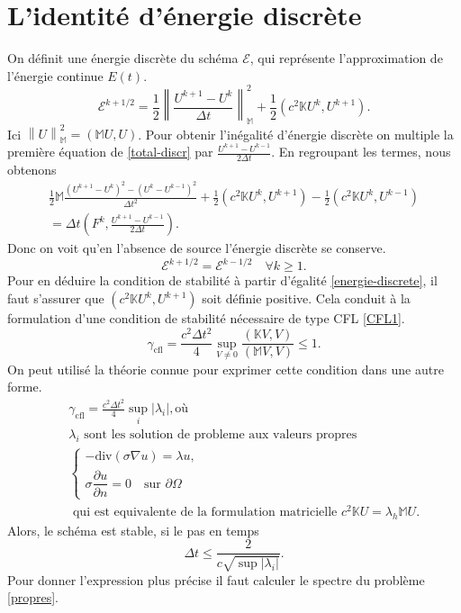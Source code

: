 \documentclass[12pt]{article}
\newcommand\norm[1]{\left\lVert#1\right\rVert}
\newcommand{\pd}[2]{ %
	\dfrac{\partial #1}{\partial #2}
}
\begin{document}
	\section{L'identité d'énergie discrète}
	On définit une énergie discrète du schéma $\mathcal{E}$, qui représente l'approximation de l'énergie continue $E(t)$.
	\begin{equation*}
	\mathcal{E}^{k + 1/2} = \frac{1}{2}\norm{\frac{U^{k+1} - U^k}{\Delta t}}_\mathbb{M}^2 + \frac{1}{2}(c^2\mathbb{K}U^k, U^{k+1}).
	\end{equation*}
	Ici $\norm{U}_\mathbb{M}^2 = (\mathbb{M}U,U)$. Pour obtenir l'inégalité d'énergie discrète on multiple la première équation de \eqref{total-discr} par $\frac{U^{k+1} - U^{k - 1}}{2\Delta t}$. En regroupant les termes, nous obtenons
	\begin{multline*}
	\frac{1}{2}\mathbb{M}\frac{(U^{k+1} - U^k)^2 - (U^k - U^{k-1})^2}{\Delta t^2} + \frac{1}{2}(c^2\mathbb{K}U^k, U^{k+1}) - \frac{1}{2}(c^2\mathbb{K}U^{k}, U^{k-1}) \\= \Delta t(F^k, \frac{U^{k+1} - U^{k - 1}}{2\Delta t}).
	\end{multline*}
	Donc on voit qu'en l'absence de source l'énergie discrète se conserve.
	\begin{equation}
	\label{energie-discrete}
	\mathcal{E}^{k +1/2} = \mathcal{E}^{k - 1/2} \quad \forall k \geq 1.
	\end{equation}
	Pour en déduire la condition de stabilité à partir d'égalité \eqref{energie-discrete}, il faut s'assurer que $(c^2\mathbb{K}U^k, U^{k+1})$ soit définie positive. Cela conduit à la formulation d'une condition de stabilité nécessaire de type CFL \eqref{CFL1}.
	\begin{equation}
	\label{CFL1}
	\gamma_{\text{cfl}} = \frac{c^2 \Delta t^2}{4}\sup_{V \neq 0} \frac{(\mathbb{K}V, V)}{(\mathbb{M}V, V)} \leq 1.
	\end{equation}
	On peut utilisé la théorie connue pour exprimer cette condition dans une autre forme.
	\begin{eqnarray}\nonumber
	& &\gamma_{\text{cfl}} = \frac{c^2 \Delta t^2}{4} \sup_i|\lambda_i|, \text{où}\\
	\nonumber
	& &\lambda_i \text{ sont les solution de probleme aux valeurs propres}\\
	\label{propres}
	& &\begin{cases}
	-\text{div}(\sigma\nabla u ) = \lambda u,\\
	\sigma \pd{u}{n} = 0 \quad \text{sur } \partial\Omega
	\end{cases} \\
	\nonumber
	& &\text{ qui est equivalente de la formulation matricielle } c^2\mathbb{K}U = \lambda_h \mathbb{M}U.
	\end{eqnarray}
	Alors, le schéma est stable, si le pas en temps 
	\begin{equation}
	\label{CFL}
	\Delta t \leq \frac{2}{c \sqrt{\sup |\lambda_i|}}.
	\end{equation}
	Pour donner l'expression plus précise il faut calculer le spectre du problème \eqref{propres}.
	
\end{document}
